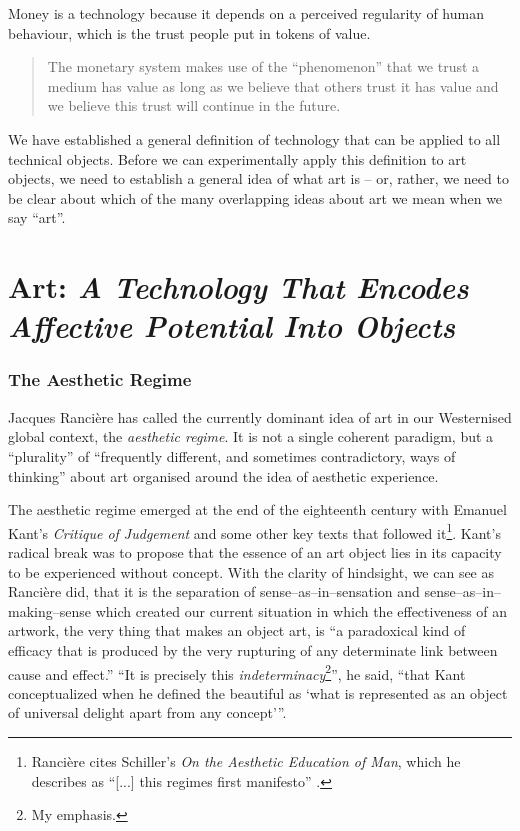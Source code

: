 \documentclass[letterpaper]{article}
\begin{document}
    Money is a technology because it depends on a perceived regularity of human behaviour, which is the trust people put in tokens of value.

    \begin{quote}
        The monetary system makes use of the “phenomenon” that we trust a medium has value as long as we believe that others trust it has value and we believe this trust will continue in the future. \citep[p.55]{theNatureOfTechnology2009}
    \end{quote}

    We have established a general definition of technology that can be applied to all technical objects. Before we can experimentally apply this definition to art objects, we need to establish a general idea of what art is – or, rather, we need to be clear about which of the many overlapping ideas about art we mean when we say “art”.

\section{Art: \emph{A Technology That Encodes Affective Potential Into Objects}}

    \subsubsection{The Aesthetic Regime}

    Jacques Rancière has called the currently dominant idea of art in our Westernised global context, the \emph{aesthetic regime}. It is not a single coherent paradigm, but a “plurality” of “frequently different, and sometimes contradictory, ways of thinking” \citep[p.8]{RanciereMdrnTms2022} about art organised around the idea of aesthetic experience.
    
    The aesthetic regime emerged at the end of the eighteenth century with Emanuel Kant's \emph{Critique of Judgement} and some other key texts that followed it\footnote{
        Rancière cites Schiller's \emph{On the Aesthetic Education of Man}, which he describes as “[...] this regimes first manifesto” \citep[pp.23–24]{RancierPltcsOfThAsthtcs2004}.
    }. Kant's radical break was to propose that the essence of an art object lies in its capacity to be experienced without concept. With the clarity of hindsight, we can see as Rancière did, that it is the separation of sense–as–in–sensation and sense–as–in–making–sense which created our current situation in which the effectiveness of an artwork, the very thing that makes an object art, is “a paradoxical kind of efficacy that is produced by the very rupturing of any determinate link between cause and effect.” \citep[p.51]{RancierThEmncptdSpcttr2009} “It is precisely this \emph{indeterminacy}\footnote{
        My emphasis.
    }”, he said, “that Kant conceptualized when he defined the beautiful as ‘what is represented as an object of universal delight apart from any concept’”. \citep[p.52]{RancierThEmncptdSpcttr2009}
\end{document}
